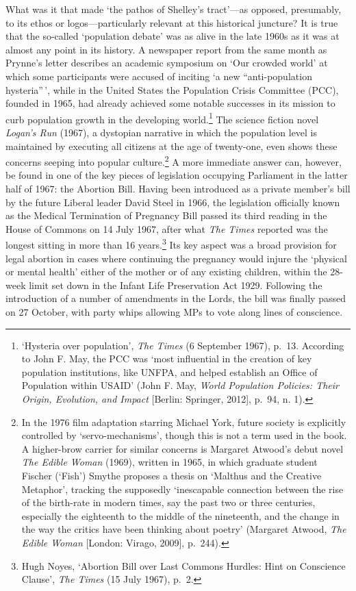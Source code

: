 \documentclass[]{article}
\begin{document}
\noindent What was it that made `the pathos of Shelley's tract'---as
opposed, presumably, to its ethos or logos---particularly relevant at
this historical juncture? It is true that the so-called `population
debate' was as alive in the late 1960s as it was at almost any point in
its history. A newspaper report from the same month as Prynne's letter
describes an academic symposium on `Our crowded world' at which some
participants were accused of inciting `a new ``anti-population
hysteria''\,', while in the United States the Population Crisis
Committee (PCC), founded in 1965, had already achieved some notable
successes in its mission to curb population growth in the developing
world.\footnote{`Hysteria over population', \emph{The Times} (6
  September 1967), p.~13. According to John F. May, the PCC was `most
  influential in the creation of key population institutions, like
  UNFPA, and helped establish an Office of Population within USAID'
  (John F. May, \emph{World Population Policies: Their Origin,
  Evolution, and Impact} {[}Berlin: Springer, 2012{]}, p.~94, n. 1).}
The science fiction novel \emph{Logan's Run} (1967), a dystopian
narrative in which the population level is maintained by executing all
citizens at the age of twenty-one, even shows these concerns seeping
into popular culture.\footnote{In the 1976 film adaptation starring
  Michael York, future society is explicitly controlled by
  `servo-mechanisms', though this is not a term used in the book. A
  higher-brow carrier for similar concerns is Margaret Atwood's debut
  novel \emph{The Edible Woman} (1969), written in 1965, in which
  graduate student Fischer (`Fish') Smythe proposes a thesis on `Malthus
  and the Creative Metaphor', tracking the supposedly `inescapable
  connection between the rise of the birth-rate in modern times, say the
  past two or three centuries, especially the eighteenth to the middle
  of the nineteenth, and the change in the way the critics have been
  thinking about poetry' (Margaret Atwood, \emph{The Edible Woman}
  {[}London: Virago, 2009{]}, p.~244).} A more immediate answer can,
however, be found in one of the key pieces of legislation occupying
Parliament in the latter half of 1967: the Abortion Bill. Having been
introduced as a private member's bill by the future Liberal leader David
Steel in 1966, the legislation officially known as the Medical
Termination of Pregnancy Bill passed its third reading in the House of
Commons on 14 July 1967, after what \emph{The Times} reported was the
longest sitting in more than 16 years.\footnote{Hugh Noyes, `Abortion
  Bill over Last Commons Hurdles: Hint on Conscience Clause', \emph{The
  Times} (15 July 1967), p.~2.} Its key aspect was a broad provision for
legal abortion in cases where continuing the pregnancy would injure the
`physical or mental health' either of the mother or of any existing
children, within the 28-week limit set down in the Infant Life
Preservation Act 1929. Following the introduction of a number of
amendments in the Lords, the bill was finally passed on 27 October, with
party whips allowing MPs to vote along lines of conscience.
\end{document}
